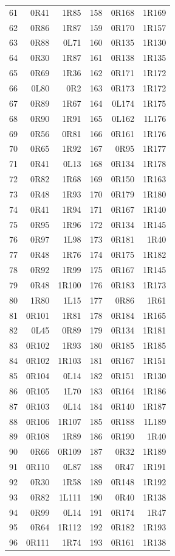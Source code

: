 {\begin{longtable}{rrr@{\hspace{2.5em}}rrr}
61 & 0R41 & 1R85 & 158 & 0R168 & 1R169\\
62 & 0R86 & 1R87 & 159 & 0R170 & 1R157\\
63 & 0R88 & 0L71 & 160 & 0R135 & 1R130\\
64 & 0R30 & 1R87 & 161 & 0R138 & 1R135\\
65 & 0R69 & 1R36 & 162 & 0R171 & 1R172\\
66 & 0L80 & 0R2 & 163 & 0R173 & 1R172\\
67 & 0R89 & 1R67 & 164 & 0L174 & 1R175\\
68 & 0R90 & 1R91 & 165 & 0L162 & 1L176\\
69 & 0R56 & 0R81 & 166 & 0R161 & 1R176\\
70 & 0R65 & 1R92 & 167 & 0R95 & 1R177\\
71 & 0R41 & 0L13 & 168 & 0R134 & 1R178\\
72 & 0R82 & 1R68 & 169 & 0R150 & 1R163\\
73 & 0R48 & 1R93 & 170 & 0R179 & 1R180\\
74 & 0R41 & 1R94 & 171 & 0R167 & 1R140\\
75 & 0R95 & 1R96 & 172 & 0R134 & 1R145\\
76 & 0R97 & 1L98 & 173 & 0R181 & 1R40\\
77 & 0R48 & 1R76 & 174 & 0R175 & 1R182\\
78 & 0R92 & 1R99 & 175 & 0R167 & 1R145\\
79 & 0R48 & 1R100 & 176 & 0R183 & 1R173\\
80 & 1R80 & 1L15 & 177 & 0R86 & 1R61\\
81 & 0R101 & 1R81 & 178 & 0R184 & 1R165\\
82 & 0L45 & 0R89 & 179 & 0R134 & 1R181\\
83 & 0R102 & 1R93 & 180 & 0R185 & 1R185\\
84 & 0R102 & 1R103 & 181 & 0R167 & 1R151\\
85 & 0R104 & 0L14 & 182 & 0R151 & 1R130\\
86 & 0R105 & 1L70 & 183 & 0R164 & 1R186\\
87 & 0R103 & 0L14 & 184 & 0R140 & 1R187\\
88 & 0R106 & 1R107 & 185 & 0R188 & 1L189\\
89 & 0R108 & 1R89 & 186 & 0R190 & 1R40\\
90 & 0R66 & 0R109 & 187 & 0R32 & 1R189\\
91 & 0R110 & 0L87 & 188 & 0R47 & 1R191\\
92 & 0R30 & 1R58 & 189 & 0R148 & 1R192\\
93 & 0R82 & 1L111 & 190 & 0R40 & 1R138\\
94 & 0R99 & 0L14 & 191 & 0R174 & 1R47\\
95 & 0R64 & 1R112 & 192 & 0R182 & 1R193\\
96 & 0R111 & 1R74 & 193 & 0R161 & 1R138\\
\end{longtable}}
